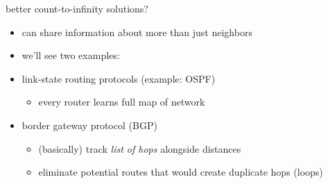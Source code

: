 \begin{frame}{better count-to-infinity solutions?}
    \begin{itemize}
    \item can share information about more than just neighbors
    \vspace{.5cm}
    \item we'll see two examples:
    \item link-state routing protocols (example: OSPF)
        \begin{itemize}
        \item every router learns full map of network
        \end{itemize}
    \item border gateway protocol (BGP)
        \begin{itemize}
        \item (basically) track \textit{list of hops} alongside distances
        \item eliminate potential routes that would create duplicate hops (loops)
        \end{itemize}
    \end{itemize}
\end{frame}
